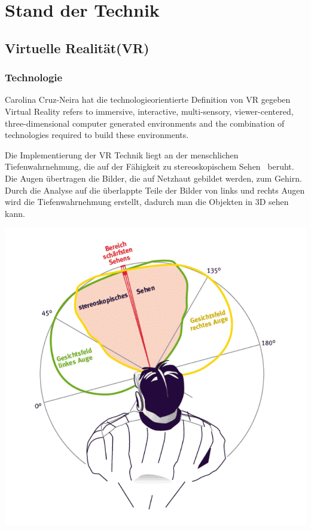 \section{Stand der Technik}
 \subsection{Virtuelle Realität(VR)}
  \subsubsection{Technologie}
Carolina Cruz-Neira hat die technologieorientierte Definition von VR gegeben \glqq Virtual Reality refers to immersive, interactive, multi-sensory, viewer-centered, three-dimensional computer generated environments and the combination of technologies required to build these environments.\grqq\ \citep{19}
  
Die Implementierung der VR Technik liegt an der menschlichen Tiefenwahrnehmung, die auf der Fähigkeit zu \glqq stereoskopischem Sehen \grqq\ beruht.\citep{20} Die Augen übertragen die Bilder, die auf Netzhaut gebildet werden, zum Gehirn. Durch die Analyse auf die überlappte Teile der Bilder von links und rechts Augen wird die Tiefenwahrnehmung erstellt, dadurch man die Objekten in 3D sehen kann.

\includegraphics[width=\textwidth]{images/stereoskopischesSehen.png}

